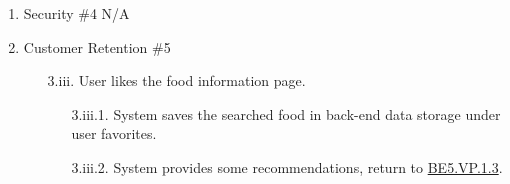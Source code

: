 \documentclass[]{article}
\begin{document}
\begin{enumerate}[{\bf BE1.}]
\begin{enumerate}[{\bf VP1.}]
\begin{enumerate}
				\end{enumerate}
			\item Security \#4 
				N/A
			\item Customer Retention \#5
				\begin{enumerate}
					\item[3.iii.] User likes the food information page.
					\begin{enumerate}
						\item[3.iii.1.] System saves the searched food in back-end data storage under user favorites.
						\item[3.iii.2.] System provides some recommendations, return to \hyperlink{BE5.VP.1.3}{BE5.VP.1.3}.
					\end{enumerate}
				\end{enumerate}
		\end{enumerate}


\end{enumerate}
\end{document}
